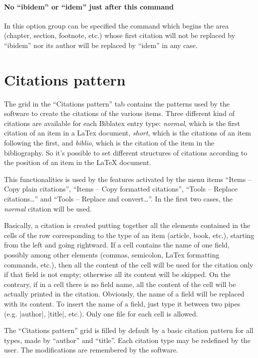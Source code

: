 \documentclass[a4paper,12pt]{report}
\begin{document}
\paragraph{No “ibidem” or “idem” just after this command} In this option group can be specified the command which begins the area (chapter, section, footnote, etc.) whose first citation will not be replaced by “ibidem” nor its author will be replaced by “idem” in any case.

\section{Citations pattern}

The grid in the “Citations pattern” tab contains the patterns used by the software to create the citations of the various items. Three different kind of citations are available for each Biblatex entry type: \textit{normal}, which is the first citation of an item in a LaTex document, \textit{short}, which is the citations of an item following the first, and \textit{biblio}, which is the citation of the item in the bibliography. So it's possible to set different structures of citations according to the position of an item in the LaTeX document.

This functionalities is used by the features activated by the menu items “Items -- Copy plain citations”, “Items -- Copy formatted citations”, “Tools -- Replace citations\dots” and “Tools -- Replace and convert\dots”. In the first two cases, the \textit{normal} citation will be used.

Basically, a citation is created putting together all the elements contained in the cells of the row corresponding to the type of an item (article, book, etc.), starting from the left and going rightward. If a cell contains the name of one field, possibly among other elements (commas, semicolon, LaTex formatting commands, etc.), then all the content of the cell will be used for the citation only if that field is not empty; otherwise all its content will be skipped. On the contrary, if in a cell there is no field name, all the content of the cell will be actually printed in the citation. Obviously, the name of a field will be replaced with its content. To insert the name of a field, just type it between two pipes (e.g. |author|, |title|, etc.). Only one file for each cell is allowed.

The “Citations pattern” grid is filled by default by a basic citation pattern for all types, made by “author” and “title”. Each citation type may be redefined by the user. The modifications are remembered by the software.
\end{document}
